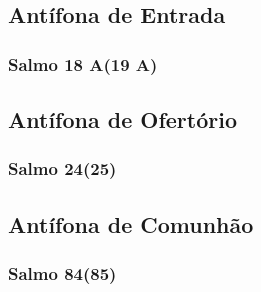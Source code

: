 \subsection{Antífona de Entrada}
\nopagebreak


\subsubsection{Salmo 18 A(19 A)}
\nopagebreak


\subsection{Antífona de Ofertório}
\nopagebreak


\subsubsection{Salmo 24(25)}
\nopagebreak


\AllowPageFlush

\subsection{Antífona de Comunhão}
\nopagebreak


\subsubsection{Salmo 84(85)}
\nopagebreak
